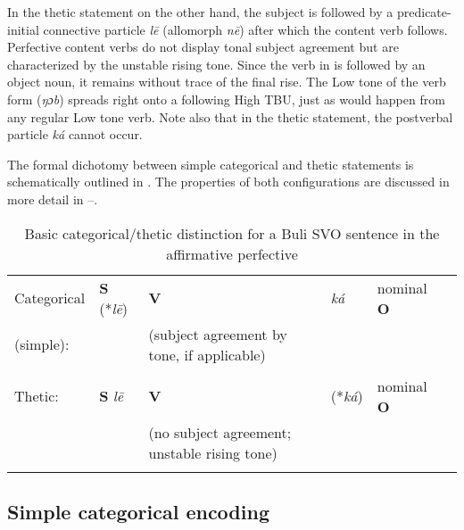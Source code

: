 \documentclass[output=paper]{langsci/langscibook}
\begin{document}
In the thetic statement on the other hand, the subject is followed by a predicate-initial connective particle \textit{l}\textit{\={e}} (allomorph \textit{n\={e}}) after which the content verb follows. Perfective content verbs do not display tonal subject agreement but are characterized by the unstable rising tone. Since the verb in  is followed by an object noun, it remains without trace of the final rise. The Low tone of the verb form (\textit{ŋɔb}) spreads right onto a following High TBU, just as would happen from any regular Low tone verb. Note also that in the thetic statement, the postverbal particle \textit{ká} cannot occur.

  The formal dichotomy between simple categorical and thetic statements is schematically outlined in . The properties of both configurations are discussed in more detail in --.
 
\begin{table}
\caption{Basic categorical/thetic distinction for a Buli SVO sentence in the affirmative perfective}
\label{tab:2}

\begin{tabularx}{\textwidth}{XXXXXX}
\lsptoprule

{Categorical} & {\textbf{S}} {(*\textit{l\={e}})} & {\textbf{V} } & {\textit{ká}} & {nominal \textbf{O}}\\
{(simple):} & & {(subject agreement by tone, if applicable)} & { }\\
& & {}
\\
{Thetic:} & {\textbf{S}} {\textit{l\={e}}} & {\textbf{V} } & {(*\textit{ká})} & {nominal \textbf{O}}\\
& & {(no subject agreement; unstable rising tone)} \\

\lspbottomrule
\end{tabularx}

\end{table} 

\subsection{Simple categorical encoding}\label{sec:schwarz:3.2}
\end{document}
